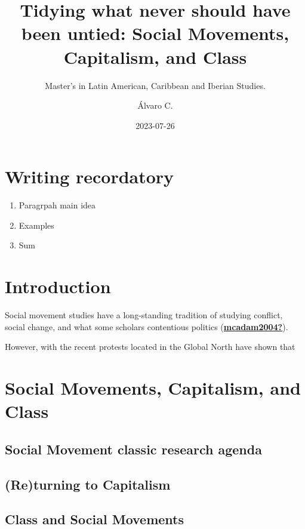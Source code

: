 \documentclass[
]{article}
\title{Tidying what never should have been untied: Social Movements,
Capitalism, and Class}
\subtitle{Master's in Latin American, Caribbean and Iberian Studies.}
\author{Álvaro C.}
\date{2023-07-26}
\providecommand{\tightlist}{%
  \setlength{\itemsep}{0pt}\setlength{\parskip}{0pt}}
\begin{document}
\maketitle

\newpage

\hypertarget{writing-recordatory}{%
\section{Writing recordatory}\label{writing-recordatory}}

\begin{enumerate}
\def\labelenumi{\arabic{enumi}.}
\tightlist
\item
  Paragrpah main idea
\item
  Examples
\item
  Sum
\end{enumerate}

\hypertarget{introduction}{%
\section{Introduction}\label{introduction}}

Social movement studies have a long-standing tradition of studying
conflict, social change, and what some scholars contentious politics
(\protect\hyperlink{ref-mcadam2004}{\textbf{mcadam2004?}}).

However, with the recent protests located in the Global North have shown
that

\hypertarget{social-movements-capitalism-and-class}{%
\section{Social Movements, Capitalism, and
Class}\label{social-movements-capitalism-and-class}}

\hypertarget{social-movement-classic-research-agenda}{%
\subsection{Social Movement classic research
agenda}\label{social-movement-classic-research-agenda}}

\hypertarget{returning-to-capitalism}{%
\subsection{(Re)turning to Capitalism}\label{returning-to-capitalism}}

\hypertarget{class-and-social-movements}{%
\subsection{Class and Social
Movements}\label{class-and-social-movements}}
\end{document}
